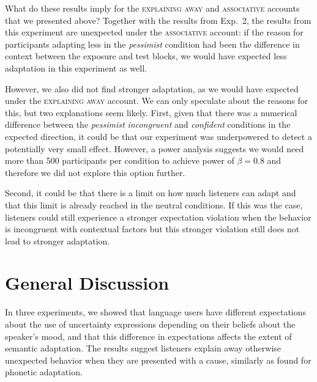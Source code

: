 What do these results imply for the \textsc{explaining away} and \textsc{associative} accounts that we presented above? Together with the results from Exp.~2, the results from this experiment are unexpected under the \textsc{associative} account: if the reason for participants adapting less in the \textit{pessimist} condition had been the difference in context between the exposure and test blocks, we would have expected less adaptation in this experiment as well.

However, we also did not find stronger adaptation, as we would have expected under the \textsc{explaining away} account. We can only speculate about the reasons for this, but two explanations seem likely. First, given that there was a numerical difference between the \textit{pessimist incongruent} and \textit{confident} conditions in the expected direction, it could be that our experiment was underpowered to detect a potentially very small effect. However, a power analysis suggests we would need more than 500 participants per condition to achieve power of $\beta=0.8$ and therefore we did not explore this option further.

Second, it could be that there is a limit on how much listeners can adapt and that this limit is already reached in the neutral conditions. If this was the case, listeners could still experience a stronger expectation violation when the behavior is incongruent with contextual factors but this stronger violation still does not lead to stronger adaptation. 


\section{General Discussion}

In three experiments, we showed that language users have different expectations about the use of uncertainty expressions depending on their beliefs about the speaker's mood, and that this difference in expectations affects the extent of semantic adaptation. The results suggest listeners explain away otherwise unexpected behavior when they are presented with a cause, similarly as \cite{Kraljic2008} found for phonetic adaptation.

